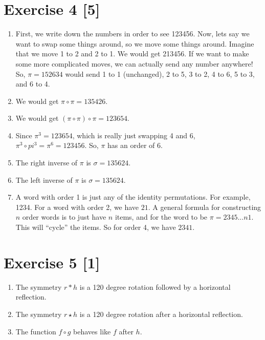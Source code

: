 \documentclass{article}
\begin{document}
\section*{Exercise 4 [5]}
\begin{enumerate}
    \item {
        First, we write down the numbers in order to see 123456. Now, lets say we 
        want to swap some things around, so we move some things around. Imagine that 
        we move 1 to 2 and 2 to 1. We would get 213456. If we want to make some more 
        complicated moves, we can actually send any number anywhere! So, \(\pi = 152634\)
        would send 1 to 1 (unchanged), 2 to 5, 3 to 2, 4 to 6, 5 to 3, and 6 to 4.
    }
    \item {
        We would get \(\pi \circ \pi = 135426\). 
    }
    \item {
        We would get \((\pi \circ \pi) \circ \pi = 123654\). 
    }
    \item {
        Since \(\pi^3 = 123654\), which is really just swapping 4 and 6, 
        \(\pi^3 \circ pi^3 = \pi^6 = 123456\). So, \(\pi\) has an order of 6.
    }
    \item {
        The right inverse of \(\pi\) is \(\sigma = 135624\). 
    }
    \item {
        The left inverse of \(\pi\) is \(\sigma = 135624\). 
    }
    \item {
        A word with order 1 is just any of the identity permutations. For example, 
        1234. For a word with order 2, we have \(21\). A general formula for 
        constructing \(n\) order words is to just have \(n\) items, and for the 
        word to be \(\pi = 2345...n1\). This will ``cycle'' the items. So for 
        order 4, we have \(2341\). 
    }
\end{enumerate}
\pagebreak

\section*{Exercise 5 [1]}
\begin{enumerate}
    \item {
        The symmetry \(r \ast h\) is a 120 degree rotation followed by a horizontal 
        reflection.
    }
    \item {
        The symmetry \(r \star h\) is a 120 degree rotation after a horizontal 
        reflection.
    }
    \item {
        The function \(f \circ g\) behaves like \(f\) after \(h\). 
    }
\end{enumerate}
\pagebreak
\end{document}
